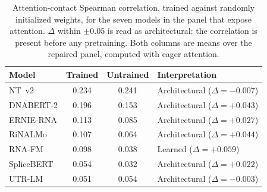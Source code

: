 \begin{table}[htbp]
\centering
\caption{Attention-contact Spearman correlation, trained against randomly
initialized weights, for the seven models in the panel that expose attention.
$\Delta$ within $\pm 0.05$ is read as architectural: the
correlation is present before any pretraining. Both columns are means over the
repaired panel, computed with eager attention.}
\label{tab:attn_trained_untrained}
\small
\begin{tabular}{@{}lccl@{}}
\toprule
\textbf{Model} & \textbf{Trained} & \textbf{Untrained} & \textbf{Interpretation} \\
\midrule
NT~v2        & 0.234 & 0.241 & Architectural ($\Delta = -0.007$) \\
DNABERT-2    & 0.196 & 0.153 & Architectural ($\Delta = +0.043$) \\
ERNIE-RNA    & 0.113 & 0.085 & Architectural ($\Delta = +0.027$) \\
RiNALMo      & 0.107 & 0.064 & Architectural ($\Delta = +0.044$) \\
RNA-FM       & 0.098 & 0.038 & Learned ($\Delta = +0.059$) \\
SpliceBERT   & 0.054 & 0.032 & Architectural ($\Delta = +0.022$) \\
UTR-LM       & 0.051 & 0.054 & Architectural ($\Delta = -0.003$) \\
\bottomrule
\end{tabular}
\end{table}
